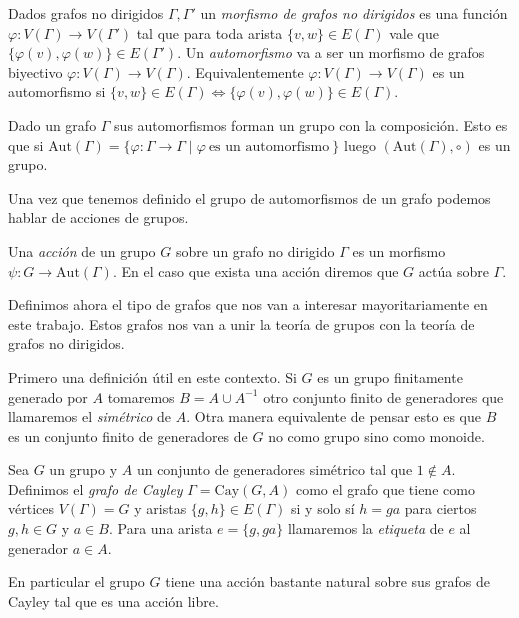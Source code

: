 \documentclass[tesis.tex]{subfiles}
\begin{document}
\begin{deff}
	Dados grafos no dirigidos $\Gamma, \Gamma'$ un \emph{morfismo de grafos no dirigidos} es una función $\varphi:V(\Gamma) \to V(\Gamma')$ tal que para toda arista $\{ v,w \} \in E(\Gamma)$ vale que $\{  \varphi(v), \varphi(w) \} \in E(\Gamma')$.
	Un \emph{automorfismo} va a ser un morfismo de grafos biyectivo $\varphi:V(\Gamma) \to V(\Gamma)$.
	Equivalentemente $\varphi: V(\Gamma) \to V(\Gamma)$ es un automorfismo si
	$\{ v,w \} \in E(\Gamma) \iff \{ \varphi(v), \varphi(w) \} \in E(\Gamma)$. 
\end{deff}

Dado un grafo $\Gamma$ sus automorfismos forman un grupo con la composición.
Esto es que si $\text{Aut}(\Gamma) = \{ \varphi: \Gamma \to \Gamma  \mid \varphi \ \text{es un automorfismo} \  \}$ luego $(\text{Aut}(\Gamma), \circ)$ es un grupo.

Una vez que tenemos definido el grupo de automorfismos de un grafo podemos hablar de acciones de grupos.

\begin{deff}
	Una \emph{acción} de un grupo $G$ sobre un grafo no dirigido $\Gamma$ es un morfismo $\psi:G \to \text{Aut}(\Gamma)$.
	En el caso que exista una acción diremos que $G$ actúa sobre $\Gamma$.
\end{deff}




Definimos ahora el tipo de grafos que nos van a interesar mayoritariamente en este trabajo.
Estos grafos nos van a unir la teoría de grupos con la teoría de grafos no dirigidos.

Primero una definición útil en este contexto.
Si $G$ es un grupo finitamente generado por $A$ tomaremos $B = A \cup A^{-1}$ otro conjunto finito de generadores que llamaremos el \emph{simétrico} de $A$.
Otra manera equivalente de pensar esto es que $B$ es un conjunto finito de generadores de $G$ no como grupo sino como monoide.

\begin{deff}
	Sea $G$ un grupo y $A$ un conjunto de generadores simétrico tal que $1 \notin A$.
	Definimos el \emph{grafo de Cayley} $\Gamma = \text{Cay}(G,A)$ como el grafo que tiene como vértices $V(\Gamma) = G$ y aristas $\{g,h\} \in E(\Gamma)$ si y solo sí $h=ga$ para ciertos $g,h \in G$ y $a \in B$. 
	Para una arista $e = \{g,ga\}$ llamaremos la \emph{etiqueta} de $e$ al generador $a \in A$.
\end{deff}

En particular el grupo $G$ tiene una acción bastante natural sobre sus grafos de Cayley tal que es una acción libre.
\end{document}
